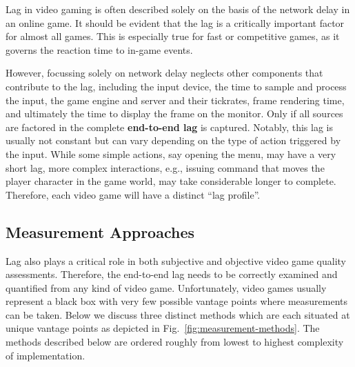 Lag in video gaming is often described solely on the basis of the network delay in an online game. It should be evident that the lag is a critically important factor for almost all games. This is especially true for fast or competitive games, as it governs the reaction time to in-game events.

However, focussing solely on network delay neglects other components that contribute to the lag, including the input device, the time to sample and process the input, the game engine and server and their tickrates, frame rendering time, and ultimately the time to display the frame on the monitor. Only if all sources are factored in the complete \textbf{end-to-end lag} is captured. Notably, this lag is usually not constant but can vary depending on the type of action triggered by the input. While some simple actions, say opening the menu, may have a very short lag, more complex interactions, e.g., issuing command that moves the player character in the game world, may take considerable longer to complete. %
Therefore, each video game will have a distinct ``lag profile''.  




\subsection{Measurement Approaches}
\label{sec:measurementapproaches}

Lag also plays a critical role in both subjective and objective video game quality assessments. Therefore, the end-to-end lag needs to be correctly examined and quantified from any kind of video game. Unfortunately, video games usually represent a black box with very few possible vantage points where measurements can be taken. Below we discuss three distinct methods which are each situated at unique vantage points as depicted in Fig.~\ref{fig:measurement-methods}.
The methods described below are ordered roughly from lowest to highest 
complexity of implementation.

